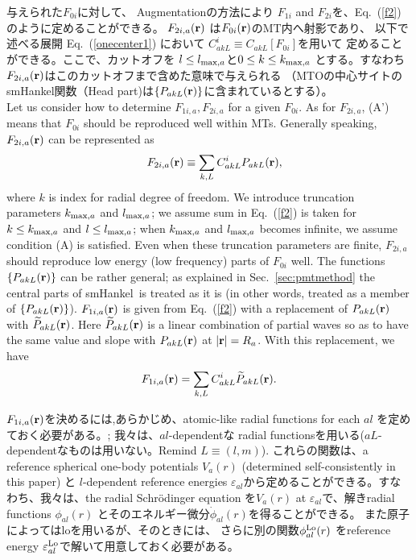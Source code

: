 \documentclass[twocolumn,showpacs,preprintnumbers,amsmath,amssymb,floatfix]{revtex4-1}
\newcommand{\bfr}{{\bf r}}
\newcommand{\refeq}[1]{Eq.~(\ref{#1})}
\newcommand{\req}[1]{\mbox{Eq.~\!(\ref{#1})}}
\newcommand{\refsec}[1]{\mbox{Sec.~\!\ref{#1}}}
\def\eal{\varepsilon_{al}}
\def\eallo{\varepsilon^{\rm Lo}_{al}}
\def\smh{smHankel}
\def\wPakL{\widetilde{P}_{akL}}
\def\CiakL{C^i_{akL}}
\def\philo{{\phi}^{\rm Lo}_{al}}
\begin{document}
与えられた$F_{0i}$に対して、
Augmentationの方法により $F_{1i}$ and $F_{2i}$を、\req{f2}のように定めることができる。
$F_{2i,a}(\bfr)$ は$F_{0i}(\bfr)$のMT内へ射影であり、
以下で述べる展開 \req{onecenter1} において $\CiakL\equiv C_{akL}[F_{0i}]$を用いて
定めることができる。ここで、カットオフを
$l\le l_{{\rm max},a}$と$0\le k\le k_{{\rm max},a}$ とする。すなわち
$F_{2i,a}(\bfr)$はこのカットオフまで含めた意味で与えられる
（MTOの中心サイトの\smh 関数（Head part)は$\{P_{akL}(\bfr)\}$に含まれているとする）。\\
Let us consider how to determine $F_{1i,a},F_{2i,a}$ for
a given $F_{0i}$. As for $F_{2i,a}$, (A') means that 
$F_{0i}$ should be reproduced well within MTs.
Generally speaking, $F_{2i,a}(\bfr)$ can be represented as
\begin{eqnarray}
&&F_{2i,a}(\bfr)\equiv \sum_{k,L} \CiakL P_{akL}(\bfr), \label{f2}
\end{eqnarray}
where $k$ is index for radial degree of freedom. 
We introduce truncation parameters
$k_{{\rm max},a}$ and $l_{{\rm max},a}$; we assume 
sum in \req{f2} is taken for $k\le k_{{\rm max},a}$ and $l \le l_{{\rm max},a}$;
when $k_{{\rm max},a}$ and $l_{{\rm max},a}$ becomes infinite, we assume
condition (A) is satisfied. Even when these truncation
parameters are finite, $F_{2i,a}$ should reproduce
low energy (low frequency) parts of $F_{0i}$ well. 
The functions $\{P_{akL}(\bfr)\}$ can be rather general; 
as explained in \refsec{sec:pmtmethod}
the central parts of \smh\ is treated as it is
(in other words, treated as a member of $\{P_{akL}(\bfr)\}$). %
$F_{1i,a}(\bfr)$ is given from \refeq{f2}
with a replacement of ${P}_{akL}(\bfr)$ with $\widetilde{P}_{akL}(\bfr)$.
Here $\widetilde{P}_{akL}(\bfr)$ is a linear combination of
partial waves so as to have the same value and slope with
${P}_{akL}(\bfr)$ at $|\bfr|=R_a$. With this replacement, we have 
\begin{eqnarray}
F_{1i,a}(\bfr) = \sum_{k,L} C^i_{akL} \wPakL(\bfr). \label{f1}
\end{eqnarray}

$F_{1i,a}(\bfr)$を決めるには,あらかじめ、atomic-like radial functions for
each $al$ を定めておく必要がある。; 我々は、$al$-dependentな
radial functionsを用いる($aL$-dependentなものは用いない。Remind $L\equiv(l,m)$).
これらの関数は、a reference spherical one-body potentials $V_a(r)$ (determined
self-consistently in this paper) と $l$-dependent reference energies
$\eal$から定めることができる。すなわち、我々は、the radial Schr\"odinger
equation を$V_a(r)$ at $\eal$で、解きradial functions $\phi_{al}(r)$
とそのエネルギー微分$\dot{\phi}_{al}(r)$を得ることができる。
また原子によってはloを用いるが、そのときには、
さらに別の関数$\philo(r)$ \cite{eal}をreference energy $\eallo$で解いて用意しておく必要がある。
\end{document}
